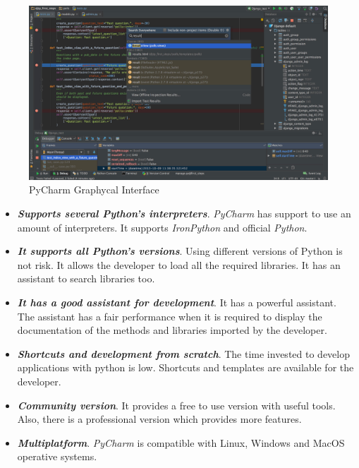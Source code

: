 \begin{figure}[H]
\begin{centering}
\includegraphics[scale=0.15]{IMGS/PYCHARM.jpg}
\caption{PyCharm Graphycal Interface \label{PYCHARM}}
\end{centering}
\end{figure}

\begin{itemize}

\item \textbf{\textit{Supports several Python's interpreters}}. \textit{PyCharm} has support to use an amount of interpreters. It supports \textit{IronPython} and official \textit{Python}.

\item \textbf{\textit{It supports all Python's versions}}. Using different versions of Python is not risk. It allows the developer to load all the required libraries. It has an assistant to search libraries too.

\item \textbf{\textit{It has a good assistant for development}}. It has a powerful assistant. The assistant has a fair performance when it is required to display the documentation of the methods and libraries imported by the developer.

\item \textbf{\textit{Shortcuts and development from scratch}}. The time invested to develop applications with python is low. Shortcuts and templates are available for the developer.

\item \textbf{\textit{Community version}}. It provides a free to use version with useful tools. Also, there is a professional version which provides more features.

\item \textbf{\textit{Multiplatform}}. \textit{PyCharm} is compatible with Linux, Windows and MacOS operative systems.

\end{itemize}

